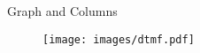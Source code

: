 \begin{frame}{Graph and Columns}
    \hspace{1cm}
    \begin{minipage}{0.5\linewidth}
        \medskip
        \begin{figure}[h]
            \centering
            \texttt{[image: images/dtmf.pdf]}
        \end{figure}
    \end{minipage}
    \end{frame}

